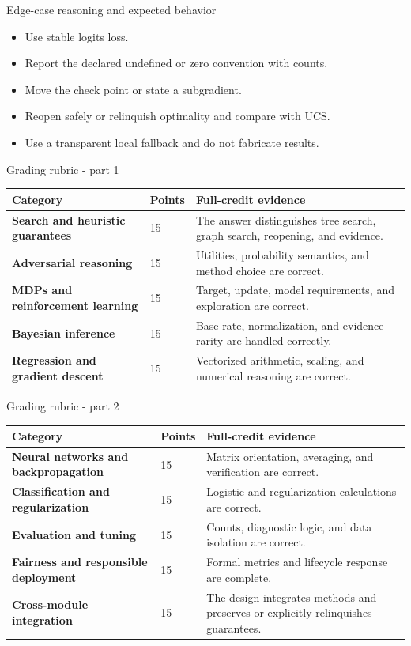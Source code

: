 \documentclass[aspectratio=169,11pt]{beamer}
\begin{document}
\begin{frame}{Edge-case reasoning and expected behavior}
\small
\begin{itemize}
  \item Use stable logits loss.
  \item Report the declared undefined or zero convention with counts.
  \item Move the check point or state a subgradient.
  \item Reopen safely or relinquish optimality and compare with UCS.
  \item Use a transparent local fallback and do not fabricate results.
\end{itemize}
\end{frame}

\begin{frame}{Grading rubric - part 1}
\scriptsize
\begin{tabularx}{\textwidth}{>{\bfseries}p{} p{} X}
\toprule
Category & Points & Full-credit evidence \\
\midrule
Search and heuristic guarantees & 15 & The answer distinguishes tree search, graph search, reopening, and evidence. \\
Adversarial reasoning & 15 & Utilities, probability semantics, and method choice are correct. \\
MDPs and reinforcement learning & 15 & Target, update, model requirements, and exploration are correct. \\
Bayesian inference & 15 & Base rate, normalization, and evidence rarity are handled correctly. \\
Regression and gradient descent & 15 & Vectorized arithmetic, scaling, and numerical reasoning are correct. \\
\bottomrule
\end{tabularx}
\end{frame}

\begin{frame}{Grading rubric - part 2}
\scriptsize
\begin{tabularx}{\textwidth}{>{\bfseries}p{} p{} X}
\toprule
Category & Points & Full-credit evidence \\
\midrule
Neural networks and backpropagation & 15 & Matrix orientation, averaging, and verification are correct. \\
Classification and regularization & 15 & Logistic and regularization calculations are correct. \\
Evaluation and tuning & 15 & Counts, diagnostic logic, and data isolation are correct. \\
Fairness and responsible deployment & 15 & Formal metrics and lifecycle response are complete. \\
Cross-module integration & 15 & The design integrates methods and preserves or explicitly relinquishes guarantees. \\
\bottomrule
\end{tabularx}
\end{frame}
\end{document}
